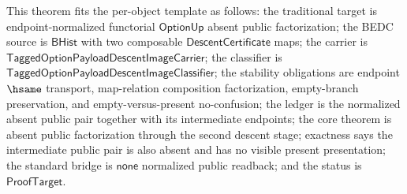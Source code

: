 \begin{theorem}
\label{thm:tagged-option-composite-image-classifier-normalized-absent-public-factorization}
This theorem fits the per-object template as follows: the traditional target is
endpoint-normalized functorial $\mathsf{OptionUp}$ absent public factorization;
the BEDC source is $\mathsf{BHist}$ with two composable
$\mathsf{DescentCertificate}$ maps; the carrier is
$\mathsf{TaggedOptionPayloadDescentImageCarrier}$; the classifier is
$\mathsf{TaggedOptionPayloadDescentImageClassifier}$; the stability obligations
are endpoint $\hsame$ transport, map-relation composition factorization,
empty-branch preservation, and empty-versus-present no-confusion; the ledger is
the normalized absent public pair together with its intermediate endpoints; the
core theorem is absent public factorization through the second descent stage;
exactness says the intermediate public pair is also absent and has no visible
present presentation; the standard bridge is $\mathsf{none}$ normalized public
readback; and the status is $\mathsf{ProofTarget}$.


\end{theorem}
